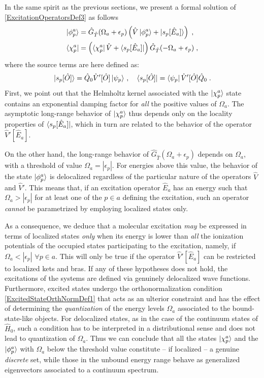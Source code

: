 \documentclass[reprint,aps,prb]{revtex4-1}
\newcommand{\eps}{\epsilon}
\newcommand{\be}{\begin{equation}}
\newcommand{\ee}{\end{equation}}
\newcommand{\nn}{\notag}
\newcommand{\op}[1]{\hat {#1}}
\newcommand{\hnot}{\op{H}_0}
\newcommand{\GH}{\op G_{\op T}}
\begin{document}
In the same spirit as the previous sections, we present a formal solution of \eqref{ExcitationOperatorsDef3} as follows
\begin{align}
\ket{\phi^a_p} &= \GH(\Omega_a+\eps_p)\left(\op V \ket{\phi^a_p} + \ket{s_p[\op E_a]} \right) \;, \nn \\
\bra {\chi^a_p} &=\left(\bra{\chi^a_p} \op V  + \bra{s_p[\op E_a]}\right)  \GH(-\Omega_a+\eps_p)\;,
\end{align}
where the source terms are here defined as:
\be
 \ket{s_p[\op O]} =  \op Q_0 \op V'[\op O] \ket{\psi_p}\,, \quad
 \bra{s_p[\op O]} =   \bra{\psi_p} \op V'[\op O] \op Q_0 \nn \;.
\ee
First, we point out that the Helmholtz kernel associated with the $\ket{\chi^a_p}$ state
contains an exponential damping factor for \emph{all} the positive values of $\Omega_a$.
The asymptotic long-range behavior of $\ket{\chi^a_p}$ thus depends only on the locality properties of
$\bra{s_p[\op E_a]}$, which in turn are related to the behavior of the operator $\op V'[\op E_a]$.

On the other hand, the long-range behavior of $\GH(\Omega_a+\eps_p)$ depends on
$\Omega_a$, with a threshold of value $\Omega_a=|\eps_p|$.
For energies above this value, the behavior of the state $\ket{\phi^a_p}$ is
delocalized regardless of the particular nature of the operators $\op V$ and $\op V'$.
This means that, if an excitation operator $\op E_a$ has an energy such that
$\Omega_a>|\eps_p|$  for at least one of the $p \in a$ defining the excitation,
such an operator \emph{cannot} be parametrized by employing localized states only.

As a consequence, we deduce that a molecular excitation \emph{may} be expressed in terms of localized states
\emph{only} when its energy is lower than \emph{all} the ionization potentials of the occupied states participating to the excitation,
namely, if $\Omega_a<|\eps_p|$ $\forall p \in a$. This will only be true if the operator
$\op V'[\op E_a]$ can be restricted to localized kets and bras.
If any of these hypotheses does not hold, the excitations of the systems are defined via genuinely delocalized wave functions.
Furthermore, excited states undergo the orthonormalization condition
\eqref{ExcitedStateOrthNormDef1} that acts as an ulterior constraint and has the effect of determining the \emph{quantization}
of the energy levels $\Omega_a$ associated to the bound-state-like objects.
For delocalized states, as in the case of the continuum states of $\hnot$,
such a condition has to be interpreted in a distributional sense and does not lead to quantization of $\Omega_a$.
Thus we can conclude that all the states $\ket{\chi^a_p}$ and the $\ket{\phi^a_p}$ with $\Omega_a$ below the threshold value constitute
-- if localized -- a genuine \emph{discrete} set, while those in the unbound energy range behave as generalized eigenvectors associated to a
continuum spectrum.
\end{document}
